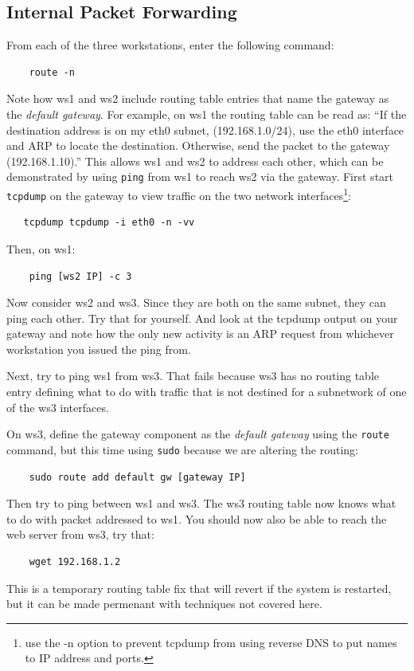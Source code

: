 \subsection{Internal Packet Forwarding}
From each of the three workstations, enter the following command:
\begin{verbatim}
    route -n
\end{verbatim}
\noindent Note how ws1 and ws2 include routing table entries that name the
gateway as the \textit{default gateway}.  For example, on ws1 the routing table can be read as:
``If the destination address is on my eth0 subnet, (192.168.1.0/24), use the eth0 interface
and ARP to locate the destination.  Otherwise, send the packet to the gateway (192.168.1.10).'' 
This allows ws1 and ws2 to address each other, which 
can be demonstrated by using \texttt{ping} from ws1 to reach ws2 via the gateway.  First start
{\tt tcpdump} on the gateway to view traffic on the two network interfaces\footnote{use the -n option to prevent tcpdump from
using reverse DNS to put names to IP address and ports.}:   
\begin{verbatim}
   tcpdump tcpdump -i eth0 -n -vv
\end{verbatim}

\noindent Then, on ws1:
\begin{verbatim}
    ping [ws2 IP] -c 3
\end{verbatim}

Now consider ws2 and ws3.  Since they are both on the same subnet, they can ping
each other.  Try that for yourself. And look at the tcpdump output on your gateway
and note how the only new activity is an ARP request from whichever workstation you
issued the ping from. 

Next, try to ping ws1 from ws3.  That fails because ws3 has no routing table entry defining what to do with traffic 
that is not destined for a subnetwork of one of the ws3 interfaces.

On ws3, define the gateway component as the \textit{default gateway} using the 
\texttt{route} command, but this time using \texttt{sudo} because we are altering the routing:

\begin{verbatim}
    sudo route add default gw [gateway IP]
\end{verbatim}
\noindent Then try to ping between ws1 and ws3.  The ws3 routing table now knows what
to do with packet addressed to ws1.  You should now also be able to reach the web server
from ws3, try that:
\begin{verbatim}
    wget 192.168.1.2
\end{verbatim}  
This is a temporary routing table fix that will revert if the
system is restarted, but it can be made permenant with techniques not covered here.

